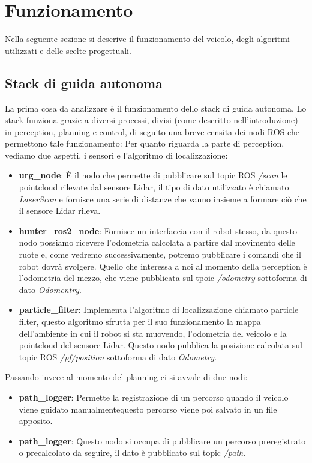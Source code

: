 \section{Funzionamento}
Nella seguente sezione si descrive il funzionamento del veicolo, degli algoritmi utilizzati e delle scelte progettuali.

\subsection{Stack di guida autonoma}
La prima cosa da analizzare è il funzionamento dello stack di guida autonoma.
Lo stack funziona grazie a diversi processi, divisi (come descritto nell'introduzione) in perception, planning e control, di seguito una breve censita dei nodi ROS che permettono tale funzionamento:
Per quanto riguarda la parte di perception, vediamo due aspetti, i sensori e l'algoritmo di localizzazione:

\begin{itemize}
  \item \textbf{urg\_node}: È il nodo che permette di pubblicare sul topic ROS \textit{/scan} le pointcloud rilevate dal sensore Lidar, il tipo di dato utilizzato è chiamato \textit{LaserScan} e fornisce una serie di distanze che vanno insieme a formare ciò che il sensore Lidar rileva.
  \item \textbf{hunter\_ros2\_node}: Fornisce un interfaccia con il robot stesso, da questo nodo possiamo ricevere l'odometria calcolata a partire dal movimento delle ruote e, come vedremo successivamente, potremo pubblicare i comandi che il robot dovrà svolgere. Quello che interessa a noi al momento della perception è l'odometria del mezzo, che viene pubblicata sul tpoic \textit{/odometry} sottoforma di dato \textit{Odomentry}. 
  \item \textbf{particle\_filter}: Implementa l'algoritmo di localizzazione chiamato particle filter, questo algoritmo sfrutta per il suo funzionamento la mappa dell'ambiente in cui il robot si sta muovendo, l'odometria del veicolo e la pointcloud del sensore Lidar. Questo nodo pubblica la posizione calcolata sul topic ROS \textit{/pf/position} sottoforma di dato \textit{Odometry}.
\end{itemize}

\noindent Passando invece al momento del planning ci si avvale di due nodi:

\begin{itemize}
  \item \textbf{path\_logger}: Permette la registrazione di un percorso quando il veicolo viene guidato manualmentequesto percorso viene poi salvato in un file apposito.
  \item \textbf{path\_logger}: Questo nodo si occupa di pubblicare un percorso preregistrato o precalcolato da seguire, il dato è pubblicato sul topic \textit{/path}.  
\end{itemize}

